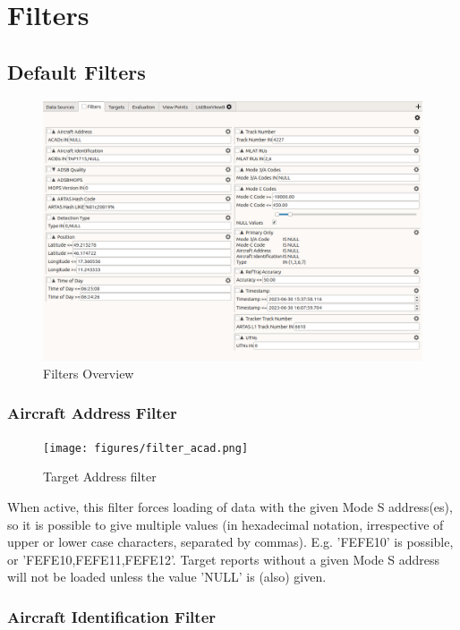 
\chapter{Filters}
\label{sec:filters} 

\section{Default Filters}
\label{sec:default_filters}

\begin{figure}[H]
    \hspace*{-2.5cm}
    \includegraphics[width=19cm,frame]{figures/ui_filters.png}
  \caption{Filters Overview}
\end{figure}

\subsection{Aircraft Address Filter}

\begin{figure}[H]
  \center
    \texttt{[image: figures/filter\_acad.png]}
  \caption{Target Address filter}
\end{figure}

When active, this filter forces loading of data with the given Mode S address(es), so it is possible to give multiple values (in hexadecimal notation, irrespective of upper or lower case characters, separated by commas). E.g. 'FEFE10' is possible, or 'FEFE10,FEFE11,FEFE12'. Target reports without a given Mode S address will not be loaded unless the value 'NULL' is (also) given.

\subsection{Aircraft Identification Filter}

